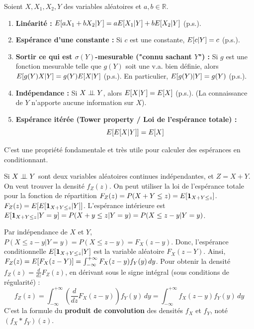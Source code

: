 \begin{proposition}
Soient $X, X_1, X_2, Y$ des variables aléatoires et $a, b \in \mathbb{R}$.
\begin{enumerate}
    \item \textbf{Linéarité :} $E[aX_1 + bX_2|Y] = aE[X_1|Y] + bE[X_2|Y]$ (p.s.).
    \item \textbf{Espérance d'une constante :} Si $c$ est une constante, $E[c|Y] = c$ (p.s.).
    \item \textbf{Sortir ce qui est $\sigma(Y)$-mesurable ("connu sachant $Y$") :} Si $g$ est une fonction mesurable telle que $g(Y)$ soit une v.a. bien définie, alors $E[g(Y)X|Y] = g(Y)E[X|Y]$ (p.s.). En particulier, $E[g(Y)|Y] = g(Y)$ (p.s.).
    \item \textbf{Indépendance :} Si $X \mathrel{\perp\!\!\!\perp} Y$, alors $E[X|Y] = E[X]$ (p.s.). (La connaissance de $Y$ n'apporte aucune information sur $X$).
    \item \textbf{Espérance itérée (Tower property / Loi de l'espérance totale) :} 
    \[ E[E[X|Y]] = E[X] \]
\end{enumerate}
C'est une propriété fondamentale et très utile pour calculer des espérances en conditionnant.
\end{proposition}

\begin{exemple}
Si $X \mathrel{\perp\!\!\!\perp} Y$ sont deux variables aléatoires continues indépendantes, et $Z = X + Y$. On veut trouver la densité $f_Z(z)$. On peut utiliser la loi de l'espérance totale pour la fonction de répartition $F_Z(z) = P(X + Y \le z) = E[\mathbf{1}_{X+Y \le z}]$.
$F_Z(z) = E[E[\mathbf{1}_{X+Y \le z}|Y]]$. L'espérance intérieure est $E[\mathbf{1}_{X+Y \le z}|Y = y] = P(X + y \le z | Y = y) = P(X \le z - y | Y = y)$. 

Par indépendance de $X$ et $Y$, $P(X \le z - y | Y = y) = P(X \le z - y) = F_X(z - y)$. Donc, l'espérance conditionnelle $E[\mathbf{1}_{X+Y \le z}|Y]$ est la variable aléatoire $F_X(z - Y)$.
Ainsi, $F_Z(z) = E[F_X(z - Y)] = \int_{-\infty}^{+\infty} F_X(z - y)f_Y(y) \, dy$. Pour obtenir la densité $f_Z(z) = \frac{d}{dz}F_Z(z)$, en dérivant sous le signe intégral (sous conditions de régularité) :
\[ f_Z(z) = \int_{-\infty}^{+\infty} \left( \frac{d}{dz} F_X(z - y) \right) f_Y(y) \, dy = \int_{-\infty}^{+\infty} f_X(z - y)f_Y(y) \, dy \]
C'est la formule du \textbf{produit de convolution} des densités $f_X$ et $f_Y$, noté $(f_X * f_Y)(z)$.
\end{exemple}